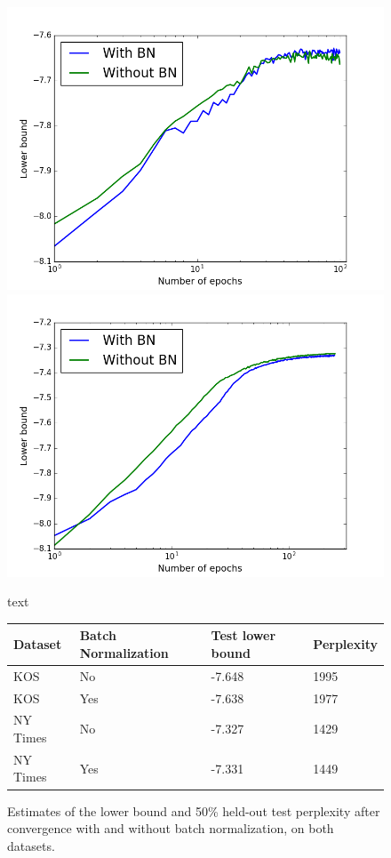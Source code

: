 \documentclass{report}
\begin{document}
	\begin{figure}
		\includegraphics[scale = 0.45]{img/bn_kos_test.png}
		\includegraphics[scale = 0.45]{img/bn_ny_test.png}
		\caption{text}
		\label{bn}
	\end{figure}
		
	\begin{figure}
		\centering
		\begin{tabular}{l|l|l|l }		
			Dataset &  Batch Normalization & Test lower bound & Perplexity  	\\
			\hline
			KOS		 & No	& -7.648 & 1995  \\
			
			KOS 	 & Yes	& -7.638 & 1977  \\ \hline
			NY Times & No	& -7.327 & 1429  \\
			
			NY Times & Yes	& -7.331 & 1449  \\
			
		\end{tabular}
		\caption{Estimates of the lower bound and 50\% held-out test perplexity after convergence with and without batch normalization, on both datasets.}
		\label{bn_performance}
	\end{figure}	
		
\end{document}
